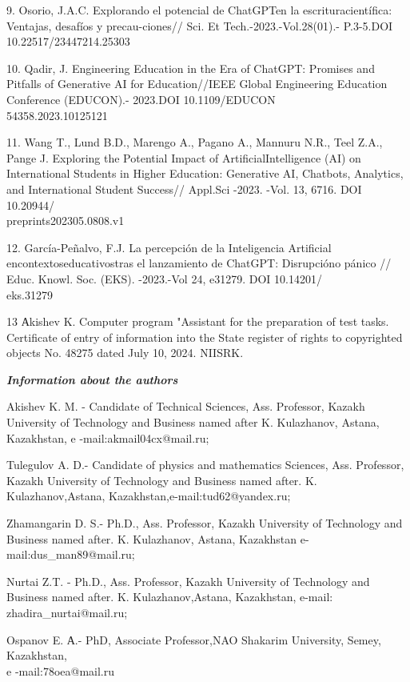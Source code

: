 \begin{noparindent}
9. Osorio, J.A.C. Explorando el potencial de ChatGPTen la
escrituracientífica: Ventajas, desafíos y precau-ciones// Sci. Et
Tech.-2023.-Vol.28(01).- P.3-5.DOI 10.22517/23447214.25303

10. Qadir, J. Engineering Education in the Era of ChatGPT: Promises and
Pitfalls of Generative AI for Education//IEEE Global Engineering
Education Conference (EDUCON).- 2023.DOI 10.1109/EDUCON\\54358.2023.10125121

11. Wang T., Lund B.D., Marengo A., Pagano A., Mannuru N.R., Teel Z.A.,
Pange J. Exploring the Potential Impact of ArtificialIntelligence (AI)
on International Students in Higher Education: Generative AI, Chatbots,
Analytics, and International Student Success// Appl.Sci -2023. -Vol. 13,
6716. DOI 10.20944/\\preprints202305.0808.v1

12. García-Peñalvo, F.J. La percepción de la Inteligencia Artificial
encontextoseducativostras el lanzamiento de ChatGPT: Disrupcióno pánico
// Educ. Knowl. Soc. (EKS). -2023.-Vol 24, e31279. DOI
10.14201/\\eks.31279

13 Аkishev K. Computer program "Assistant for the preparation of test
tasks. Certificate of entry of information into the State register of
rights to copyrighted objects No. 48275 dated July 10, 2024. NIISRK.
\end{noparindent}


\emph{{\bfseries Information about the authors}}
\begin{noparindent}

Akishev K. M. - Candidate of Technical Sciences, Ass. Professor, Kazakh
University of Technology and Business named after K. Kulazhanov, Astana,
Kazakhstan, e -mail:akmail04cx@mail.ru;

Tulegulov A. D.- Candidate of physics and mathematics Sciences, Ass.
Professor, Kazakh University of Technology and Business named after. K.
Kulazhanov,Astana, Kazakhstan,e-mail:tud62@yandex.ru;

Zhamangarin D. S.- Ph.D., Ass. Professor, Kazakh University of
Technology and Business named after. K. Kulazhanov, Astana, Kazakhstan
e-mail:dus\_man89@mail.ru;

Nurtai Z.T. - Ph.D., Ass. Professor, Kazakh University of Technology and
Business named after. K. Kulazhanov,Astana, Kazakhstan, e-mail:
zhadira\_nurtai@mail.ru;

Ospanov E. А.- PhD, Associate Professor,NAO Shakarim University, Semey,
Kazakhstan,\\ e -mail:78oea@mail.ru
\end{noparindent}

